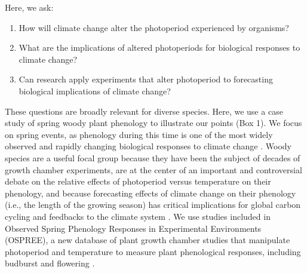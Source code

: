\documentclass{article}
\begin{document}
\par Here, we ask: 
\begin{enumerate}
\item How will climate change alter the photoperiod experienced by organisms? 
\item What are the implications of altered photoperiods for biological responses to climate change?
\item Can research apply experiments that alter photoperiod to forecasting biological implications of climate change?

\end{enumerate}
\par These questions are broadly relevant for diverse species. Here, we use a case study of spring woody plant phenology to illustrate our points (Box 1). We focus on spring events, as phenology during this time is one of the most widely observed and rapidly changing biological responses to climate change \citep{parmesan2006}. Woody species are a useful focal group because they have been the subject of decades of growth chamber experiments, are at the center of an important and controversial debate on the relative effects of photoperiod versus temperature on their phenology, and because forecasting effects of climate change on their phenology (i.e., the length of the growing season) has critical implications for global carbon cycling and feedbacks to the climate system \citep{richardson2013}. %
We use studies included in Observed Spring Phenology Responses in Experimental Environments (OSPREE), a new database of plant growth chamber studies that manipulate photoperiod and temperature to measure plant phenological responses, including budburst and flowering \citep{wolkovich2019}.%
\end{document}
